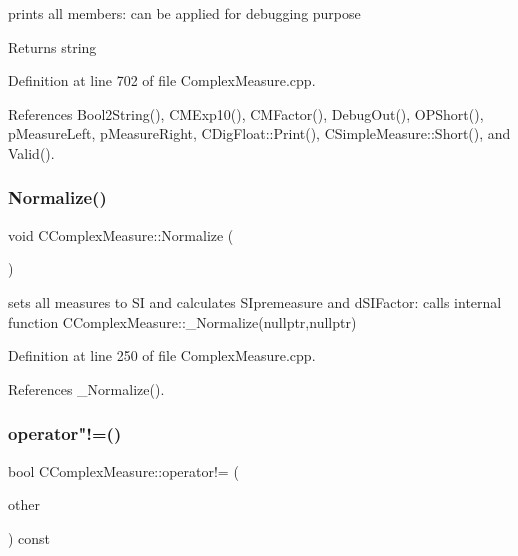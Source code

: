 prints all members\+: can be applied for debugging purpose 

\begin{DoxyReturn}{Returns}
string 
\end{DoxyReturn}


Definition at line 702 of file Complex\+Measure.\+cpp.



References Bool2\+String(), C\+M\+Exp10(), C\+M\+Factor(), Debug\+Out(), O\+P\+Short(), p\+Measure\+Left, p\+Measure\+Right, C\+Dig\+Float\+::\+Print(), C\+Simple\+Measure\+::\+Short(), and Valid().

\mbox{\label{classCComplexMeasure_a87cc1f3c3f0dafd7cbe00634124c8d46}} 
\subsubsection{\texorpdfstring{Normalize()}{Normalize()}}
{\footnotesize\ttfamily void C\+Complex\+Measure\+::\+Normalize (\begin{DoxyParamCaption}{ }\end{DoxyParamCaption})}



sets all measures to SI and calculates S\+Ipremeasure and d\+S\+I\+Factor\+: calls internal function C\+Complex\+Measure\+::\+\_\+\+Normalize(nullptr,nullptr) 



Definition at line 250 of file Complex\+Measure.\+cpp.



References \+\_\+\+Normalize().

\mbox{\label{classCComplexMeasure_ab5e7581c34b128a8b24a7237094a4fe4}} 
\subsubsection{\texorpdfstring{operator"!=()}{operator!=()}}
{\footnotesize\ttfamily bool C\+Complex\+Measure\+::operator!= (\begin{DoxyParamCaption}\item[{const \hyperlink{classCComplexMeasure}{C\+Complex\+Measure} \&}]{other }\end{DoxyParamCaption}) const}



